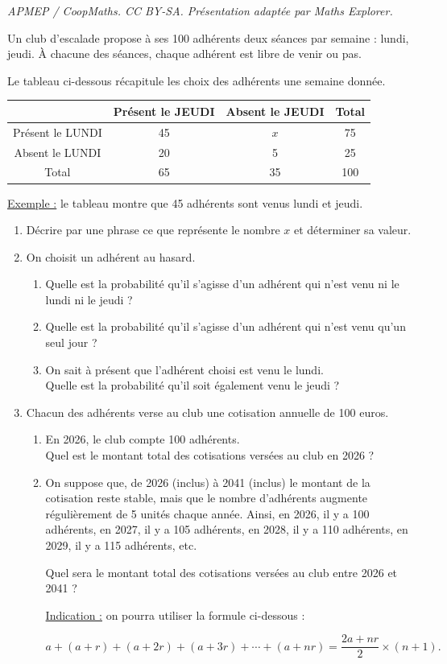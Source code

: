 \documentclass[10pt]{article}
\begin{document}
\noindent\textit{APMEP / CoopMaths. CC BY-SA. Présentation adaptée par Maths Explorer.}\par\medskip
Un club d'escalade propose à ses 100 adhérents deux séances par semaine : lundi, jeudi. À chacune des séances, chaque adhérent est libre de venir ou pas.

Le tableau ci-dessous récapitule les choix des adhérents une semaine donnée.

\begin{center}
\begin{tabular}{|c|c|c|c|}
\hline
 & Présent le JEUDI & Absent le JEUDI & Total \\
\hline
Présent le LUNDI & 45 & $x$ & 75 \\
\hline
Absent le LUNDI & 20 & 5 & 25 \\
\hline
Total & 65 & 35 & 100 \\
\hline
\end{tabular}
\end{center}

\underline{Exemple :} le tableau montre que 45 adhérents sont venus lundi et jeudi.

\begin{enumerate}
\item Décrire par une phrase ce que représente le nombre $x$ et déterminer sa valeur.

\item On choisit un adhérent au hasard.
\begin{enumerate}
\item Quelle est la probabilité qu'il s'agisse d'un adhérent qui n'est venu ni le lundi ni le jeudi ?
\item Quelle est la probabilité qu'il s'agisse d'un adhérent qui n'est venu qu'un seul jour ?
\item On sait à présent que l'adhérent choisi est venu le lundi. \\
Quelle est la probabilité qu'il soit également venu le jeudi ?
\end{enumerate}

\item Chacun des adhérents verse au club une cotisation annuelle de 100 euros.
\begin{enumerate}
\item En 2026, le club compte 100 adhérents. \\
Quel est le montant total des cotisations versées au club en 2026 ?
\item On suppose que, de 2026 (inclus) à 2041 (inclus) le montant de la cotisation reste stable, mais que le nombre d'adhérents augmente régulièrement de 5 unités chaque année. Ainsi, en 2026, il y a 100 adhérents, en 2027, il y a 105 adhérents, en 2028, il y a 110 adhérents, en 2029, il y a 115 adhérents, etc.

Quel sera le montant total des cotisations versées au club entre 2026 et 2041 ?

\underline{Indication :} on pourra utiliser la formule ci-dessous :

\[a + (a + r) + (a + 2r) + (a + 3r) + \cdots + (a + nr) = \frac{2a + nr}{2} \times (n + 1).\]
\end{enumerate}
\end{enumerate}
\end{document}
